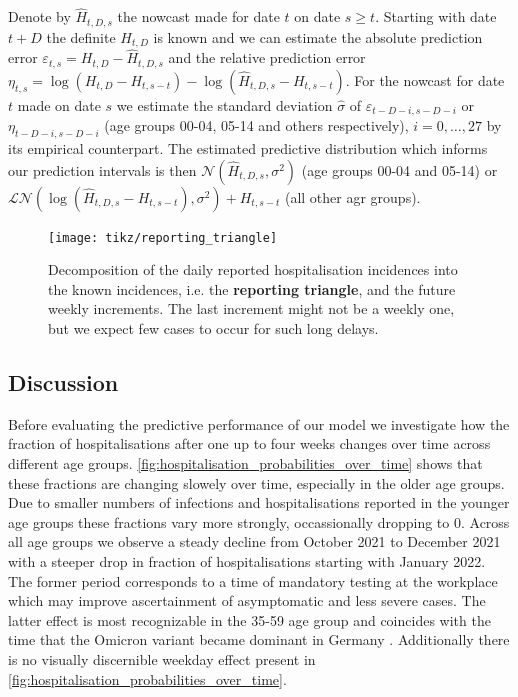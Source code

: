 Denote by \(\hat H_{t,D,s}\) the nowcast made for date \(t\) on date
\(s \geq t\). Starting with date \(t + D\) the definite \(H_{t,D}\) is
known and we can estimate the absolute prediction error
\(\varepsilon_{t,s} = H_{t,D} - \hat H_{t,D,s}\) and the relative
prediction error
\(\eta_{t,s} = \log \left( H_{t,D} - H_{t, s - t}\right) - \log \left( \hat H_{t,D,s} - H_{t, s- t} \right)\).
For the nowcast for date \(t\) made on date \(s\) we estimate the
standard deviation \(\hat\sigma\) of
\(\varepsilon_{t - D - i, s - D - i}\) or
\(\eta_{t - D - i, s - D - i}\) (age groups 00-04, 05-14 and others
respectively), \(i = 0, \dots, 27\) by its empirical counterpart. The
estimated predictive distribution which informs our prediction intervals
is then \(\mathcal N (\hat H_{t,D,s}, \sigma^2)\) (age groups 00-04 and
05-14) or
\(\mathcal{LN} \left( \log \left(\hat H_{t,D,s} - H_{t, s - t}\right), \sigma^2 \right) + H_{t, s - t}\)
(all other agr groups).

\begin{figure}
    \centering
    \texttt{[image: tikz/reporting\_triangle]}
    \caption{Decomposition of the daily reported hospitalisation incidences into the {\color{TUIl-orange} known incidences}, i.e. the \textbf{reporting triangle}, and {\color{TUIl-green}the future weekly increments}. {\color{TUIl-blue}The last increment} might not be a weekly one, but we expect few cases to occur for such long delays.}
    \label{fig:reporting_triangle}
\end{figure}

\subsection{Discussion}\label{subsec:nowcasting_discussion}
Before evaluating the predictive performance of our model we investigate
how the fraction of hospitalisations after one up to four weeks changes
over time across different age groups. 
\cref{fig:hospitalisation_probabilities_over_time} shows that these
fractions are changing slowely over time, especially in the older age
groups. Due to smaller numbers of infections and hospitalisations
reported in the younger age groups these fractions vary more strongly,
occassionally dropping to \(0\). Across all age groups we observe a
steady decline from October 2021 to December 2021 with a steeper drop in
fraction of hospitalisations starting with January 2022. The former
period corresponds to a time of mandatory testing at the workplace which
may improve ascertainment of asymptomatic and less severe cases. The
latter effect is most recognizable in the 35-59 age group and coincides
with the time that the Omicron variant became dominant in Germany
\citep{RobertKoch-Institut2022Lagebericht2022-01-20}. Additionally
there is no visually discernible weekday effect present in 
\cref{fig:hospitalisation_probabilities_over_time}.

